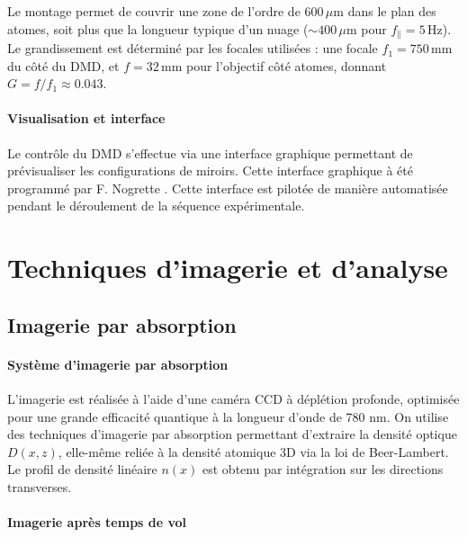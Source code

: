 Le montage permet de couvrir une zone de l’ordre de \(600\,\mu\mathrm{m}\) dans le plan des atomes, soit plus que la longueur typique d’un nuage (\(\sim 400\,\mu\mathrm{m}\) pour \(f_{\parallel}=5\,\mathrm{Hz}\)). Le grandissement est déterminé par les focales utilisées : une focale \(f_1 = 750\,\mathrm{mm}\) du côté du \gls*{DMD}, et \(f = 32\,\mathrm{mm}\) pour l’objectif côté atomes, donnant \(G = f/f_1 \approx 0.043\).

\paragraph{Visualisation et interface}

Le contrôle du \gls*{DMD} s’effectue via une interface graphique permettant de prévisualiser les configurations de miroirs. Cette interface graphique à été programmé par F. Nogrette . Cette interface est pilotée de manière automatisée pendant le déroulement de la séquence expérimentale.


\section{Techniques d’imagerie et d’analyse}
\subsection{Imagerie par absorption}

\paragraph{Système d’imagerie par absorption}

L’imagerie est réalisée à l’aide d’une caméra \gls{CCD} à déplétion profonde, optimisée pour une grande efficacité quantique à la longueur d’onde de 780 nm. On utilise des techniques d’imagerie par absorption permettant d’extraire la densité optique \( D(x, z) \), elle-même reliée à la densité atomique 3D via la loi de Beer-Lambert. Le profil de densité linéaire \( n(x) \) est obtenu par intégration sur les directions transverses.

\paragraph{Imagerie après temps de vol}

